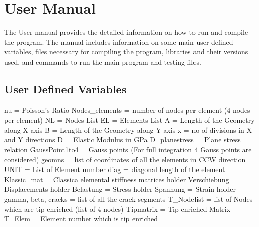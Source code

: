 \documentclass[fleqn, 12.5pt,a4paper]{report}
\begin{document}
\section{\large User Manual}
The User manual provides the detailed information on how to run and compile the program. The manual includes information on some main user defined variables, files necessary for compiling the program, libraries and their versions used, and commands to run the main program and testing files.

\subsection{User Defined Variables}
nu = Poisson's Ratio \newline
Nodes{\_}elements = number of nodes per element (4 nodes per element)\newline
NL = Nodes List\newline
EL = Elements List\newline
A = Length of the Geometry along X-axis\newline
B = Length of the Geometry along Y-axis\newline
x = no of divisions in X and Y directions\newline
D = Elastic Modulus in GPa\newline
D{\_}planestress = Plane stress relation\newline
GaussPoint1to4 = Gauss points (For full integration 4 Gauss points are considered)\newline
geomns = list of coordinates of all the elements in CCW direction\newline 
UNIT = List of Element number\newline
diag = diagonal length of the element\newline
Klassic{\_}mat = Classica elemental stiffness matrices holder\newline
Verschiebung = Displacements holder\newline
Belastung = Stress holder\newline
Spannung = Strain holder\newline
gamma, beta, cracks = list of all the crack segments\newline
T{\_}Nodelist = list of Nodes which are tip enriched (list of 4 nodes)\newline
Tipmatrix = Tip enriched Matrix\newline
T{\_}Elem = Element number which is tip enriched\newline
\end{document}
